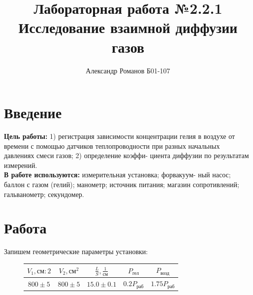 \documentclass{article}
\author{Александр Романов Б01-107}
\date{}
\title{Лабораторная работа №2.2.1 \newline Исследование взаимной диффузии газов}
\begin{document}
\maketitle
\newpage
\section{Введение}

\textbf{Цель работы:} 1) регистрация зависимости концентрации гелия
в воздухе от времени с помощью датчиков теплопроводности при
разных начальных давлениях смеси газов; 2) определение коэффи-
циента диффузии по результатам измерений.\\
\textbf{В работе используются:} измерительная установка; форвакуум-
ный насос; баллон с газом (гелий); манометр; источник питания;
магазин сопротивлений; гальванометр; секундомер.

\section {Работа}

Запишем геометрические параметры установки:
\begin{figure}[H]
    \centering
    \begin{tabular}{|c|c|c|c|c|}
        \hline
        $V_1, \text{см}:2$&$V_2, \text{см}^2$&$\frac{L}{S}, \frac{1}{\text{см}}$&$P_{\text{гел}}$&$P_{\text{возд}}$ \\\hline
        $800\pm5$&$800\pm5$&$15.0\pm0.1$&$0.2P_{\text{раб}}$&$1.75P_{\text{раб}}$ \\\hline
    \end{tabular}
\end{figure}
\end{document}
